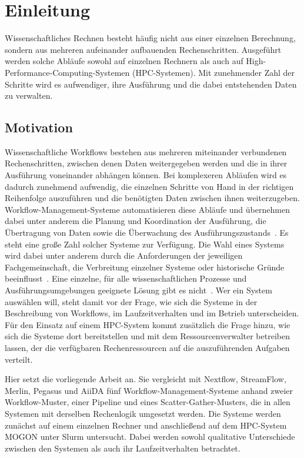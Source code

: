 \chapter{Einleitung}
\label{sec:intro}

Wissenschaftliches Rechnen besteht häufig nicht aus einer einzelnen
Berechnung, sondern aus mehreren aufeinander aufbauenden
Rechenschritten. Ausgeführt werden solche Abläufe sowohl auf einzelnen Rechnern als auch auf High-Performance-Computing-Systemen (HPC-Systemen). Mit zunehmender Zahl der Schritte wird es aufwendiger, ihre Ausführung und die dabei entstehenden Daten zu verwalten.

\section{Motivation}
\label{sec:intro:motivation}
Wissenschaftliche Workflows bestehen aus mehreren miteinander
verbundenen Rechenschritten, zwischen denen Daten weitergegeben
werden und die in ihrer Ausführung voneinander abhängen können.
Bei komplexeren Abläufen wird es dadurch zunehmend aufwendig, die
einzelnen Schritte von Hand in der richtigen Reihenfolge
auszuführen und die benötigten Daten zwischen ihnen weiterzugeben.
Workflow-Management-Systeme automatisieren diese Abläufe und
übernehmen dabei unter anderem die Planung und Koordination der
Ausführung, die Übertragung von Daten sowie die Überwachung des
Ausführungszustands~\cite[S.~28\,f.]{badia2017workflows}\cite[S.~2]{suter2026terminology}.
Es steht eine große Zahl solcher Systeme zur Verfügung. Die Wahl
eines Systems wird dabei unter anderem durch die Anforderungen der
jeweiligen Fachgemeinschaft, die Verbreitung einzelner Systeme
oder historische Gründe beeinflusst~\cite[S.~28]{badia2017workflows}. Eine einzelne, für alle wissenschaftlichen Prozesse und Ausführungsumgebungen geeignete Lösung gibt es nicht~\cite[S.~2]{suter2026terminology}. Wer ein System auswählen will, steht damit vor der Frage, wie sich die Systeme in der
Beschreibung von Workflows, im Laufzeitverhalten und im Betrieb
unterscheiden. Für den Einsatz auf einem HPC-System kommt zusätzlich die Frage hinzu, wie sich die Systeme dort bereitstellen und mit dem
Ressourcenverwalter betreiben lassen, der die verfügbaren
Rechenressourcen auf die auszuführenden Aufgaben verteilt.

Hier setzt die vorliegende Arbeit an. Sie vergleicht mit Nextflow,
StreamFlow, Merlin, Pegasus und AiiDA fünf
Workflow-Management-Systeme anhand zweier Workflow-Muster, einer
Pipeline und eines Scatter-Gather-Musters, die in allen Systemen
mit derselben Rechenlogik umgesetzt werden. Die Systeme werden
zunächst auf einem einzelnen Rechner und anschließend auf dem
HPC-System MOGON unter Slurm untersucht. Dabei werden sowohl
qualitative Unterschiede zwischen den Systemen als auch ihr
Laufzeitverhalten betrachtet.


